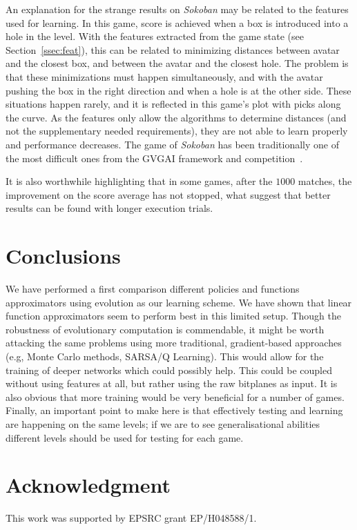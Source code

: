 \documentclass[conference]{IEEEtran}
\begin{document}
An explanation for the strange results on \textit{Sokoban} may be related to the features used for learning. In this game, score is achieved when a box is introduced into a hole in the level. With the features extracted from the game state (see Section~\ref{ssec:feat}), this can be related to minimizing distances between avatar and the closest box, and between the avatar and the closest hole. The problem is that these minimizations must happen simultaneously, and with the avatar pushing the box in the right direction and when a hole is at the other side. These situations happen rarely, and it is reflected in this game's plot with picks along the curve. As the features only allow the algorithms to determine distances (and not the supplementary needed requirements), they are not able to learn properly and performance decreases. The game of \textit{Sokoban} has been traditionally one of the most difficult ones from the GVGAI framework and competition~\cite{Perez2015}.

It is also worthwhile highlighting that in some games, after the $1000$ matches, the improvement on the score average has not stopped, what suggest that better results can be found with longer execution trials.


\section{Conclusions} \label{sec:conc}

We have performed a first comparison different policies and functions approximators using evolution as our learning scheme. We have shown that linear function approximators seem to perform best in this limited setup. Though the robustness of evolutionary computation is commendable, it might be worth attacking the same problems using more traditional, gradient-based approaches (e.g, Monte Carlo methods, SARSA/Q Learning). This would allow for the training of deeper networks which could possibly help. This could be coupled without using features at all, but rather using the raw bitplanes as input. It is also obvious that more training would be very beneficial for a number of games. Finally, an important point to make here is that effectively testing and learning are happening on the same levels; if we are to see generalisational abilities different levels should be used for testing for each game. 

 
\section*{Acknowledgment}


\noindent This work was supported by EPSRC grant EP/H048588/1.

 



\end{document}
